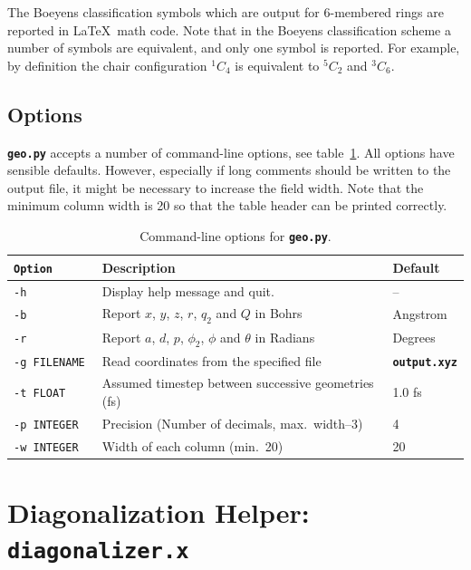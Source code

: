 \documentclass[a4paper,11pt,DIV=15,openany,twoside=false]{scrbook}
\newcommand{\ttt}[1]{\textbf{\texttt{#1}}}
\begin{document}
The Boeyens classification symbols which are output for 6-membered rings are reported in \LaTeX\ math code. Note that in the Boeyens classification scheme a number of symbols are equivalent, and only one symbol is reported. For example, by definition the chair configuration $^1C_4$ is equivalent to $^5C_2$ and $^3C_6$.

\subsection{Options}

\ttt{geo.py} accepts a number of command-line options, see table~\ref{tab:Geo_options}. All options have sensible defaults. However, especially if long comments should be written to the output file, it might be necessary to increase the field width. Note that the minimum column width is 20 so that the table header can be printed correctly.

\begin{table}[h]
  \centering
  \caption{Command-line options for \ttt{geo.py}. }
  \label{tab:Geo_options}
  \begin{tabular}{>{\tt}lll}
    \toprule
    \rmfamily Option         &Description    &Default\\
    \midrule
    -h          &Display help message and quit.         & --        \\
    -b          &Report $x$, $y$, $z$, $r$, $q_2$ and $Q$ in Bohrs       &Angstrom\\
    -r          &Report $a$, $d$, $p$, $\phi_2$, $\phi$ and $\theta$ in Radians         &Degrees\\
    -g FILENAME &Read coordinates from the specified file       &\ttt{output.xyz}\\
    -t FLOAT    &Assumed timestep between successive geometries (fs)    &1.0 fs\\
    -p INTEGER  &Precision (Number of decimals, max.~width--3)         &4\\
    -w INTEGER  &Width of each column (min.~20)                   &20\\
    \bottomrule
  \end{tabular}
\end{table}








\section{Diagonalization Helper: \ttt{diagonalizer.x}}\label{sec:diagonalizer.x}
\end{document}
